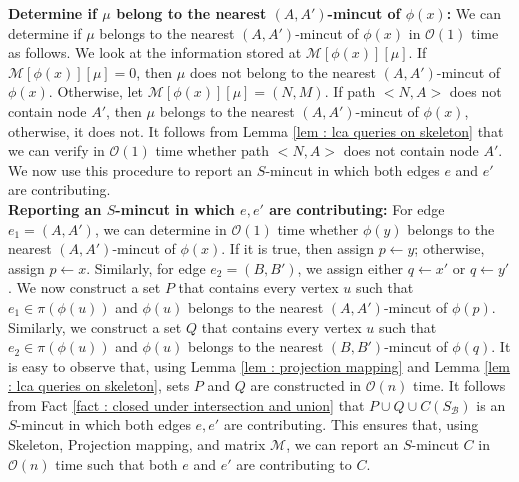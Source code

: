 \documentclass[letterpaper,11pt]{article}
\begin{document}
\noindent
\textbf{Determine if $\mu$ belong to the nearest $(A,A')$-mincut of $\phi(x)$:} We can determine if $\mu$ belongs to the nearest $(A,A')$-mincut of $\phi(x)$ in ${\mathcal O}(1)$ time as follows. We look at the information stored at ${\mathcal M}[\phi(x)][\mu]$. If ${\mathcal M}[\phi(x)][\mu]=0$, then $\mu$ does not belong to the nearest $(A,A')$-mincut of $\phi(x)$. Otherwise, let ${\mathcal M}[\phi(x)][\mu]=(N,M)$. If path $<N,A>$ does not contain node $A'$, then $\mu$ belongs to the nearest $(A,A')$-mincut of $\phi(x)$, otherwise, it does not. It follows from Lemma \ref{lem : lca queries on skeleton} that we can verify in ${\mathcal O}(1)$ time whether path $<N,A>$ does not contain node $A'$. We now use this procedure to report an $S$-mincut in which both edges $e$ and $e'$ are contributing.\\



\noindent
\textbf{Reporting an $S$-mincut in which $e,e'$ are contributing:}
For edge $e_1=(A,A')$, we can determine in ${\mathcal O}(1)$ time whether $\phi(y)$ belongs to the nearest $(A,A')$-mincut of $\phi(x)$. If it is true, then assign $p\gets y$; otherwise, assign $p\gets x$. Similarly, for edge $e_2=(B,B')$, we assign either $q\gets x'$ or $q\gets y'$. We now construct a set $P$ that contains every vertex $u$ such that $e_1\in \pi(\phi(u))$ and $\phi(u)$ belongs to the nearest $(A,A')$-mincut of $\phi(p)$. Similarly, we construct a set $Q$ that contains every vertex $u$ such that $e_2\in \pi(\phi(u))$ and $\phi(u)$ belongs to the nearest $(B,B')$-mincut of $\phi(q)$. It is easy to observe that, using Lemma \ref{lem : projection mapping} and Lemma \ref{lem : lca queries on skeleton}, sets $P$ and $Q$ are constructed in ${\mathcal O}(n)$ time. It follows from Fact \ref{fact : closed under intersection and union} that $P\cup Q\cup C(S_{\mathcal B})$ is an $S$-mincut in which both edges $e,e'$ are contributing. This ensures that, using Skeleton, Projection mapping, and matrix ${\mathcal M}$, we can report an $S$-mincut $C$ in ${\mathcal O}(n)$ time such that both $e$ and $e'$ are contributing to $C$.\\
\end{document}
